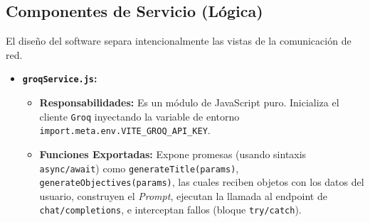 \subsection{Componentes de Servicio (Lógica)}
El diseño del software separa intencionalmente las vistas de la comunicación de red.

\begin{itemize}
    \item \textbf{\texttt{groqService.js}:}
    \begin{itemize}
        \item \textbf{Responsabilidades:} Es un módulo de JavaScript puro. Inicializa el cliente \texttt{Groq} inyectando la variable de entorno \texttt{import.meta.env.VITE\_GROQ\_API\_KEY}.
        \item \textbf{Funciones Exportadas:} Expone promesas (usando sintaxis \texttt{async/await}) como \texttt{generateTitle(params)}, \texttt{generateObjectives(params)}, las cuales reciben objetos con los datos del usuario, construyen el \textit{Prompt}, ejecutan la llamada al endpoint de \texttt{chat/completions}, e interceptan fallos (bloque \texttt{try/catch}).
    \end{itemize}
\end{itemize}
